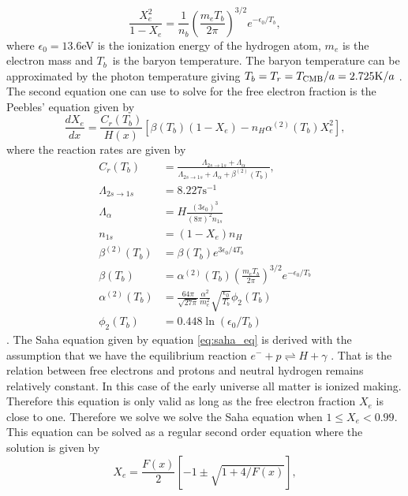 \documentclass[onecolumn]{aastex62}
\begin{document}
\begin{equation}\label{eq:saha_eq}
    \frac{X_e^2}{1-X_e} = \frac{1}{n_b} \left(\frac{m_eT_b}{2\pi}\right)^{3/2} e^{-\epsilon_0/T_b},
\end{equation}
where $\epsilon_0=13.6$eV is the ionization energy of the hydrogen atom, $m_e$ is the electron mass and $T_b$ is the baryon temperature. The baryon temperature can be approximated by the photon temperature giving $T_b =
T_r = T_{\rm CMB} / a = 2.725 \textrm{K} / a$ \cite{WintherII:2020}. The second equation one can use to solve for the free electron fraction is the Peebles' equation given by
\begin{equation}\label{eq:peeble_eq}
    \frac{dX_e}{dx} = \frac{C_r(T_b)}{H(x)} \left[\beta(T_b)(1-X_e) - n_H\alpha^{(2)}(T_b)X_e^2\right],
\end{equation}
where the reaction rates are given by
\begin{align}
    C_r(T_b) &= \frac{\Lambda_{2s\rightarrow1s} +
    \Lambda_{\alpha}}{\Lambda_{2s\rightarrow1s} + \Lambda_{\alpha} +
    \beta^{(2)}(T_b)}, \\
    \Lambda_{2s\rightarrow1s} &= 8.227 \textrm{s}^{-1}\\
    \Lambda_{\alpha} &= H\frac{(3\epsilon_0)^3}{(8\pi)^2 n_{1s}}\\
    n_{1s} &= (1-X_e)n_H \\
    \beta^{(2)}(T_b) &= \beta(T_b) e^{3\epsilon_0/4T_b} \\
    \beta(T_b) &= \alpha^{(2)}(T_b) \left(\frac{m_e
    T_b}{2\pi}\right)^{3/2} e^{-\epsilon_0/T_b} \\
    \alpha^{(2)}(T_b) &= \frac{64\pi}{\sqrt{27\pi}}
    \frac{\alpha^2}{m_e^2}\sqrt{\frac{\epsilon_0}{T_b}}\phi_2(T_b) \\
    \phi_2(T_b) &= 0.448\ln(\epsilon_0/T_b)
\end{align}
\cite{WintherII:2020}. The Saha equation given by equation \ref{eq:saha_eq} is derived with the assumption that we have the equilibrium reaction $e^- +p\rightleftharpoons H+\gamma$ \cite[p.70]{Dodelson:1282338}. That is the relation between free electrons and protons and neutral hydrogen remains relatively constant. In this case of the early universe all matter is ionized making. Therefore this equation is only valid as long as the free electron fraction $X_e$ is close to one. Therefore we solve we solve the Saha equation when $1\leq X_e<0.99$. This equation can be solved as a regular second order equation where the solution is given by
\begin{equation}
    X_e = \frac{F(x)}{2}\left[-1\pm\sqrt{1+4/F(x)}\right],
\end{equation}
\end{document}
